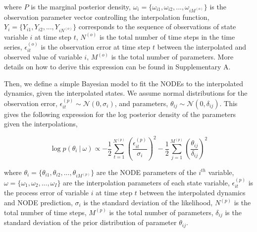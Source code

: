 \documentclass[11pt, oneside]{article}
\begin{document}
where $P$ is the marginal posterior density,
$\omega_i = \{\omega_{i1},\omega_{i2},...,\omega_{iM^{(o)}}\}$ is the observation parameter vector controlling the interpolation function,
$Y_i = \{Y_{i1},Y_{i2},...,Y_{iN^{(o)}}\}$ corresponds to the sequence of observations of state variable $i$ at time step $t$, 
$N^{(o)}$ is the total number of time steps in the time series, 
$\epsilon^{(o)}_{it}$ is the observation error at time step $t$ between the interpolated and observed  value of variable $i$, 
$M^{(o)}$ is the total number of parameters. 
More details on how to derive this expression can be found in Supplementary A.

Then, we define a simple Bayesian model to fit the NODEs to the interpolated dynamics, given the interpolated states.
We assume normal distributions for the observation error, $\epsilon^{(p)}_{it} \sim \mathcal{N}(0,\sigma_i)$, and parameters, $\theta_{ij} \sim \mathcal{N}(0,\delta_{ij})$.
This gives the following expression for the log posterior density of the parameters given the interpolations,

\vspace{-0.5cm}
\begin{equation}
    \log p(\theta_i ~|~ \omega) \propto - \frac{1}{2} \sum_{t=1}^{N^{(p)}} \left( \frac{\epsilon^{(p)}_{it}}{\sigma_i} \right)^2 - \frac{1}{2} \sum_{j=1}^{M^{(p)}} \left( \frac{\theta_{ij}}{\delta_{ij}} \right)^2
\end{equation}

where $\theta_i = \{\theta_{i1},\theta_{i2},...,\theta_{iM^{(p)}}\}$ are the NODE parameters of the $i^{th}$ variable,
$\omega = \{\omega_1,\omega_2,...,\omega_I\}$ are the interpolation parameters of each state variable, 
$\epsilon^{(p)}_{it}$ is the process error of variable $i$ at time step $t$ between the interpolated dynamics and NODE prediction, 
$\sigma_i$ is the standard deviation of the likelihood, 
$N^{(p)}$ is the total number of time steps,
$M^{(p)}$ is the total number of parameters, 
$\delta_{ij}$ is the standard deviation of the prior distribution of parameter $\theta_{ij}$.
\end{document}
